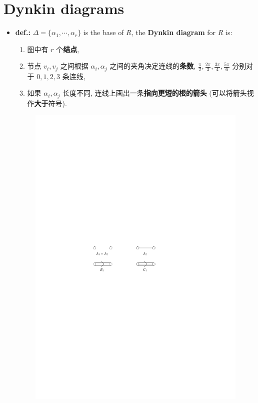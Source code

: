 \section{Dynkin diagrams} \label{7.6}
\begin{itemize}
	\item \textbf{def.:} $\Delta = \{\alpha_1, \cdots, \alpha_r\}$ is the base of $R$, the \textbf{Dynkin diagram} for $R$ is:
	\begin{enumerate}
		\item 图中有 $r$ 个\textbf{结点},
		
		\item 节点 $v_i, v_j$ 之间根据 $\alpha_i, \alpha_j$ 之间的夹角决定连线的\textbf{条数}, $\frac{\pi}{2}, \frac{2 \pi}{3}, \frac{3 \pi}{4}, \frac{5 \pi}{6}$ 分别对于 $0, 1, 2, 3$ 条连线,
		
		\item 如果 $\alpha_i, \alpha_j$ 长度不同, 连线上画出一条\textbf{指向更短的根的箭头} (可以将箭头视作\textbf{大于}符号).
	\end{enumerate}
	
	\begin{figure}[H]
		\centering
		\includegraphics[scale=1]{figures/Dynkin diagrams for the rank-two root systems.pdf}
	\end{figure}
	

\end{itemize}
